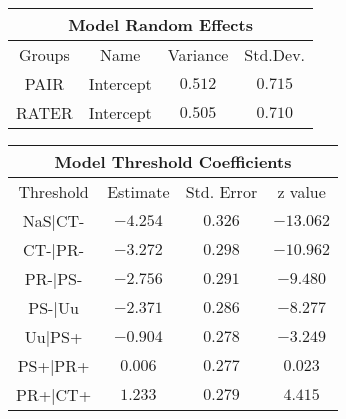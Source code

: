 \newpage
\begin{minipage}{\linewidth}
\begin{tabular}{|c|c|c|c|}
\hline
\multicolumn{4}{|c|}{Model Random Effects}\\\hline
Groups  &  Name       &  Variance & Std.Dev.\\\hline
PAIR  & Intercept & $0.512$   & $0.715$  \\\hline
RATER & Intercept & $0.505$   & $0.710$ \\\hline
\end{tabular}
\label{tab:modrand}
\end{minipage}
\newline
\newline
\newline
\begin{minipage}{\linewidth}
\begin{tabular}{|c|c|c|c|}
\hline
\multicolumn{4}{|c|}{Model Threshold Coefficients}\\\hline
Threshold &  Estimate & Std. Error & z value\\\hline
NaS|CT- & $-4.254$ & $0.326$ & $-13.062$\\\hline
CT-|PR- & $-3.272$ & $0.298$ & $-10.962$\\\hline
PR-|PS- & $-2.756$ & $0.291$ & $ -9.480$\\\hline
PS-|Uu  & $-2.371$ & $0.286$ & $ -8.277$\\\hline
Uu|PS+  & $-0.904$ & $0.278$ & $ -3.249$\\\hline
PS+|PR+ & $ 0.006$ & $0.277$ & $  0.023$\\\hline
PR+|CT+ & $ 1.233$ & $0.279$ & $  4.415$\\\hline
\end{tabular}
\label{tab:appmodthres}
\end{minipage}
